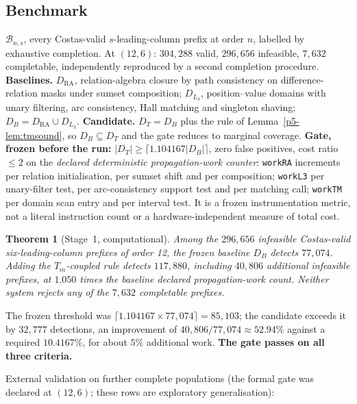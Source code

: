 \documentclass[11pt,a4paper,oneside]{report}
\newtheorem{theorem}{Theorem}[chapter]
\theoremstyle{definition}
\begin{document}
\subsection*{Benchmark}\noindent $\mathcal B_{n,s}$, every Costas-valid
$s$-leading-column prefix at order $n$, labelled by exhaustive completion. At
$(12,6)$: $304{,}288$ valid, $296{,}656$ infeasible, $7{,}632$ completable,
independently reproduced by a second completion procedure.
\textbf{Baselines.} $D_{\mathrm{RA}}$, relation-algebra closure by path
consistency on difference-relation masks under sumset composition; $D_{L_3}$,
position--value domains with unary filtering, arc consistency, Hall matching and
singleton shaving; $D_B=D_{\mathrm{RA}}\cup D_{L_3}$.
\textbf{Candidate.} $D_T=D_B$ plus the rule of Lemma~\ref{p5-lem:tmsound}, so
$D_B\subseteq D_T$ and the gate reduces to marginal coverage.
\textbf{Gate, frozen before the run:} $|D_T|\ge\lceil1.104167|D_B|\rceil$, zero
false positives, cost ratio $\le2$ on the \emph{declared deterministic propagation-work
counter}: \texttt{workRA} increments per relation initialisation, per sumset
shift and per composition; \texttt{workL3} per unary-filter test, per
arc-consistency support test and per matching call; \texttt{workTM} per domain
scan entry and per interval test. It is a frozen instrumentation metric, not a
literal instruction count or a hardware-independent measure of total cost.

\begin{theorem}[Stage~1, computational]
\label{p5-thm:f3}
Among the $296{,}656$ infeasible Costas-valid six-leading-column prefixes of order
12, the frozen baseline $D_B$ detects $77{,}074$. Adding the $T_m$-coupled rule
detects $117{,}880$, including $40{,}806$ additional infeasible prefixes, at
$1.050$ times the baseline declared propagation-work count. Neither system
rejects any of the $7{,}632$ completable prefixes.
\end{theorem}

The frozen threshold was $\lceil1.104167\times77{,}074\rceil=85{,}103$; the
candidate exceeds it by $32{,}777$ detections, an improvement of
$40{,}806/77{,}074\approx52.94\%$ against a required $10.4167\%$, for about $5\%$
additional work. \textbf{The gate passes on all three criteria.}

\medskip\noindent External validation on further complete populations (the formal
gate was declared at $(12,6)$; these rows are exploratory generalisation):
\end{document}
